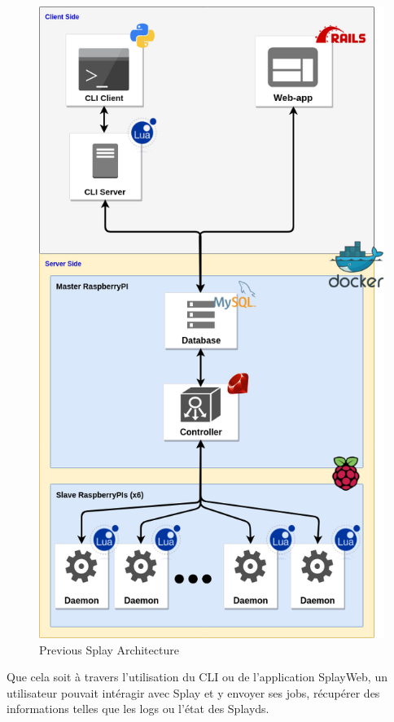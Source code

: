 \documentclass{eplmastersthesis}
\begin{document}
        \begin{figure}[H]
          \centering
          \includegraphics[scale=0.6]{figures/prev_arch.png}
          \caption{\label{prev_arch} Previous Splay Architecture}
        \end{figure}

        Que cela soit à travers l'utilisation du CLI ou de l'application SplayWeb,
        un utilisateur pouvait intéragir avec Splay et y envoyer ses jobs, récupérer
        des informations telles que les logs ou l'état des Splayds.\\
\end{document}
